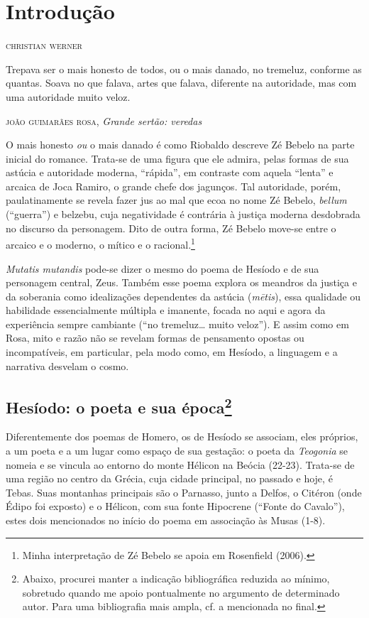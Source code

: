 \chapter{Introdução}

\begin{flushright}
\textsc{christian werner}
\end{flushright}

\epigraph{Trepava ser o mais honesto de todos, ou o mais
danado, no tremeluz, conforme as quantas. Soava
no que falava, artes que falava, diferente
na autoridade, mas com uma autoridade muito veloz.}{\textsc{joão guimarães rosa}, \emph{Grande sertão: veredas}}

\noindent{}O mais honesto \emph{ou} o mais danado é como Riobaldo descreve Zé
Bebelo na parte inicial do romance. Trata-se de uma figura que ele
admira, pelas formas de sua astúcia e autoridade moderna, ``rápida'', em
contraste com aquela ``lenta'' e arcaica de Joca Ramiro, o grande chefe
dos jagunços. Tal autoridade, porém, paulatinamente se revela fazer jus
ao mal que ecoa no nome Zé Bebelo, \emph{bellum} (``guerra'') e belzebu,
cuja negatividade é contrária à justiça moderna desdobrada no discurso
da personagem. Dito de outra forma, Zé Bebelo move-se entre o arcaico e
o moderno, o mítico e o racional.\footnote{Minha interpretação de Zé
  Bebelo se apoia em Rosenfield (2006).}

\emph{Mutatis mutandis} pode-se dizer o mesmo do poema de Hesíodo e de
sua personagem central, Zeus. Também esse poema explora os meandros da
justiça e da soberania como idealizações dependentes da astúcia
(\emph{mētis}), essa qualidade ou habilidade essencialmente múltipla e
imanente, focada no aqui e agora da experiência sempre cambiante (``no
tremeluz\ldots{} muito veloz''). E assim como em Rosa, mito e razão não
se revelam formas de pensamento opostas ou incompatíveis, em particular,
pela modo como, em Hesíodo, a linguagem e a narrativa desvelam o cosmo.

\section{Hesíodo: o poeta e sua época\protect\footnote{\MakeUppercase{A}baixo, procurei manter a
  indicação bibliográfica reduzida ao mínimo, sobretudo quando me apoio
  pontualmente no argumento de determinado autor. \MakeUppercase{P}ara uma bibliografia
  mais ampla, cf. a mencionada no final.}}

Diferentemente dos poemas de Homero, os de Hesíodo se associam, eles
próprios, a um poeta e a um lugar como espaço de sua gestação: o poeta
da \emph{Teogonia} se nomeia e se vincula ao entorno do monte Hélicon na
Beócia (22-23). Trata-se de uma região no centro da Grécia, cuja cidade
principal, no passado e hoje, é Tebas. Suas montanhas principais são o
Parnasso, junto a Delfos, o Citéron (onde Édipo foi exposto) e o
Hélicon, com sua fonte Hipocrene (``Fonte do Cavalo''), estes dois
mencionados no início do poema em associação às Musas (1-8).

